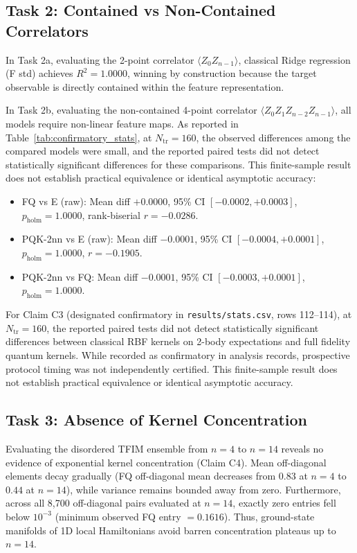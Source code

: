 \documentclass[conference]{IEEEtran}
\begin{document}
\subsection{Task 2: Contained vs Non-Contained Correlators}
In Task 2a, evaluating the 2-point correlator $\langle Z_0 Z_{n-1} \rangle$, classical Ridge regression (F std) achieves $R^2 = 1.0000$, winning by construction because the target observable is directly contained within the feature representation.

In Task 2b, evaluating the non-contained 4-point correlator $\langle Z_0 Z_1 Z_{n-2} Z_{n-1} \rangle$, all models require non-linear feature maps. As reported in Table~\ref{tab:confirmatory_stats}, at $N_{\text{tr}}=160$, the observed differences among the compared models were small, and the reported paired tests did not detect statistically significant differences for these comparisons. This finite-sample result does not establish practical equivalence or identical asymptotic accuracy:
\begin{itemize}
    \item FQ vs E (raw): Mean diff $+0.0000$, 95\% CI $[-0.0002, +0.0003]$, $p_{\text{holm}} = 1.0000$, rank-biserial $r = -0.0286$.
    \item PQK-2nn vs E (raw): Mean diff $-0.0001$, 95\% CI $[-0.0004, +0.0001]$, $p_{\text{holm}} = 1.0000$, $r = -0.1905$.
    \item PQK-2nn vs FQ: Mean diff $-0.0001$, 95\% CI $[-0.0003, +0.0001]$, $p_{\text{holm}} = 1.0000$.
\end{itemize}
For Claim C3 (designated confirmatory in \texttt{results/stats.csv}, rows 112--114), at $N_{\mathrm{tr}}=160$, the reported paired tests did not detect statistically significant differences between classical RBF kernels on 2-body expectations and full fidelity quantum kernels. While recorded as confirmatory in analysis records, prospective protocol timing was not independently certified. This finite-sample result does not establish practical equivalence or identical asymptotic accuracy.

\subsection{Task 3: Absence of Kernel Concentration}
Evaluating the disordered TFIM ensemble from $n=4$ to $n=14$ reveals no evidence of exponential kernel concentration (Claim C4). Mean off-diagonal elements decay gradually (FQ off-diagonal mean decreases from $0.83$ at $n=4$ to $0.44$ at $n=14$), while variance remains bounded away from zero. Furthermore, across all 8,700 off-diagonal pairs evaluated at $n=14$, exactly zero entries fell below $10^{-3}$ (minimum observed FQ entry $= 0.1616$). Thus, ground-state manifolds of 1D local Hamiltonians avoid barren concentration plateaus up to $n=14$.
\end{document}
